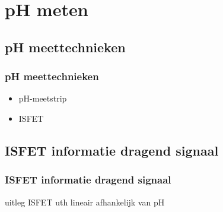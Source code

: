 \section{pH meten}
    \subsection*{pH meettechnieken}
    \begin{frame}
        \frametitle{pH meettechnieken}
    
        \begin{itemize}
            \item pH-meetstrip
            \item ISFET
        \end{itemize}
    
    \end{frame}

    \subsection{ISFET informatie dragend signaal}
    \begin{frame}
        \frametitle{ISFET informatie dragend signaal}
    
        uitleg ISFET uth lineair afhankelijk van pH
    
    \end{frame}